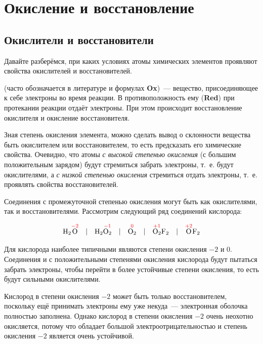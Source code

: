 \chapter{Окисление и восстановление}

\section{Окислители и восстановители}

Давайте разберёмся, при каких условиях атомы химических элементов проявляют свойства окислителей и восстановителей.

 (часто обозначается в литературе и формулах \textbf{Ox})~--- вещество, присоединяющее к себе электроны во время реакции. В противоположность ему  (\textbf{Red}) при протекании реакции отдаёт электроны. При этом происходит восстановление окислителя и окисление восстановителя.

Зная степень окисления элемента, можно сделать вывод о склонности вещества быть окислителем или восстановителем, то есть предсказать его химические свойства. Очевидно, что атомы \emph{с высокой степенью окисления} (с большим положительным зарядом) будут стремиться забрать электроны, т.~е. будут окислителями, а \emph{с низкой степенью окисления} стремиться отдать электроны, т.~е. проявлять свойства восстановителей.

Соединения с промежуточной степенью окисления могут быть как окислителями, так и восстановителями. Рассмотрим следующий ряд соединений кислорода:

\begin{equation*}
    \ce{H2}\overset{\textcolor{red}{-2}}{\ce{O}}
    \quad | \quad
    \ce{H2}\overset{\textcolor{red}{-1}}{\ce{O2}}
    \quad | \quad
    \overset{\textcolor{red}{0}}{\ce{O2}}
    \quad | \quad
    \overset{\textcolor{red}{+1}}{\ce{O2}}\ce{F2}
    \quad | \quad
    \overset{\textcolor{red}{+2}}{\ce{O}}\ce{F2}
\end{equation*}

Для кислорода наиболее типичными являются степени окисления $-2$ и 0. Соединения  и  с положительными степенями окисления кислорода будут пытаться забрать электроны, чтобы перейти в более устойчивые степени окисления, то есть будут сильными окислителями.

Кислород в степени окисления $-2$ может быть только восстановителем, поскольку ещё принимать электроны ему уже некуда~--- электронная оболочка полностью заполнена. Однако кислород в степени окисления $-2$ очень неохотно окисляется, потому что обладает большой электроотрицательностью и степень окисления $-2$ является очень устойчивой.

